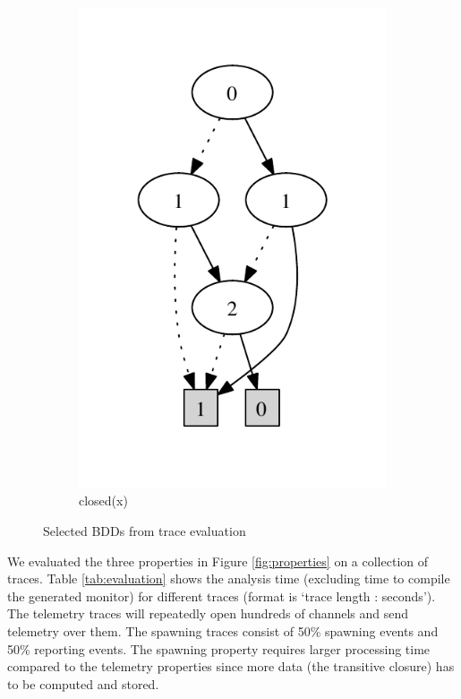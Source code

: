 \begin{figure}
\begin{subfigure}[b]{0.25\textwidth}
        \includegraphics[width=\textwidth]{figures/bdd3.pdf}
        \caption{closed(x)}
        \label{fig:bdd3}
    \end{subfigure}
    \caption{Selected BDDs from trace evaluation}
    \label{fig:bdds}
\end{figure}

\fi

\vspace{1ex}
We evaluated the three properties in Figure 
\ref{fig:properties} on a collection of traces. Table \ref{tab:evaluation} shows the  
analysis time (excluding time to compile the generated 
monitor) for different traces (format is `trace length : seconds'). The telemetry traces will repeatedly open hundreds of channels and send telemetry over them. 
%
The spawning traces consist of 50\% spawning events and 50\% reporting events. The spawning property  requires larger processing time compared to the telemetry properties since more data (the transitive closure) has to be computed and stored.

